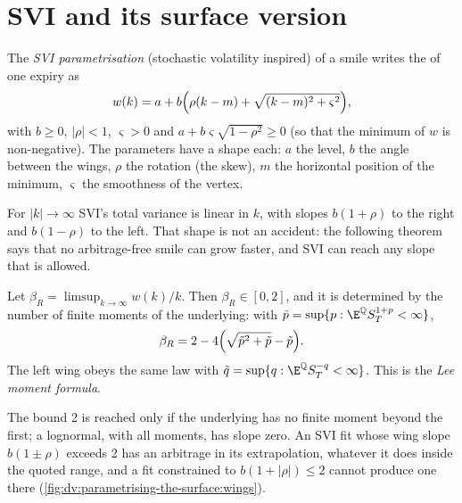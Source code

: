 \section{SVI and its surface version}

\begin{definition}\label{def:dv:parametrising-the-surface:svi}
The \emph{SVI parametrisation} (stochastic volatility
inspired) of a smile writes the  of one expiry as
\[
w(k)=a+b\Bigl(\rho(k-m)+\sqrt{(k-m)^2+\varsigma^2}\Bigr),
\]
with $b\ge0$, $|\rho|<1$, $\varsigma>0$ and $a+b\varsigma\sqrt{1-\rho^2}\ge0$ (so that the
minimum of $w$ is non-negative). The parameters have a shape each: $a$ the level, $b$ the
angle between the wings, $\rho$ the rotation (the skew), $m$ the horizontal position of the
minimum, $\varsigma$ the smoothness of the vertex.
\end{definition}

For $|k|\to\infty$ SVI's total variance is linear in $k$, with slopes $b(1+\rho)$ to the
right and $b(1-\rho)$ to the left. That shape is not an accident: the following theorem says
that no arbitrage-free smile can grow faster, and SVI can reach any slope that is allowed.

\begin{theorem}\label{thm:dv:parametrising-the-surface:lee}
Let $\beta_R=\limsup_{k\to\infty}w(k)/k$. Then $\beta_R\in[0,2]$, and it is determined by the
number of finite moments of the underlying: with $\tilde p=\sup\{p:\E^{\mathbb Q}S_T^{1+p}<\infty\}$,
\[
\beta_R=2-4\Bigl(\sqrt{\tilde p^2+\tilde p}-\tilde p\Bigr).
\]
The left wing obeys the same law with $\tilde q=\sup\{q:\E^{\mathbb Q}S_T^{-q}<\infty\}$. This is
the \emph{Lee moment formula}.
\end{theorem}
\admitted

The bound 2 is reached only if the underlying has no finite moment beyond the first; a
lognormal, with all moments, has slope zero. An SVI fit whose wing slope $b(1\pm\rho)$ exceeds
2 has an arbitrage in its extrapolation, whatever it does inside the quoted range, and a fit
constrained to $b(1+|\rho|)\le2$ cannot produce one there
(\cref{fig:dv:parametrising-the-surface:wings}).

